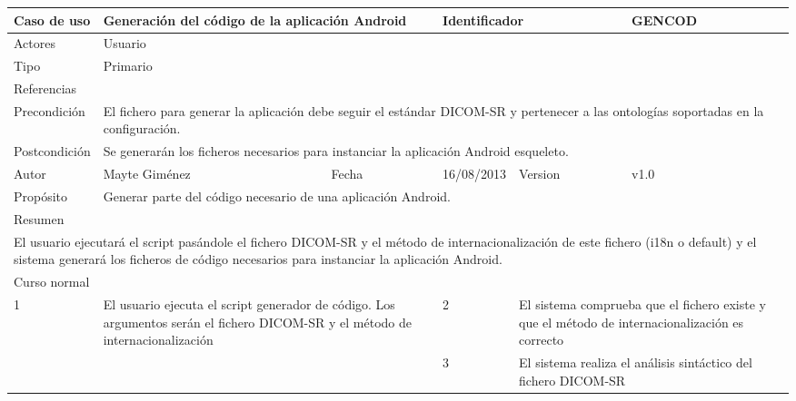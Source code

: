 \begin{center}
  \begin{longtable}{ |b{2.5cm}|b{4cm}|b{1cm}|b{2cm}|b{1.5cm}| b{2.5cm}| }
    \hline
    \cellcolor{RubineRed} {\color{White} Caso de uso} & \multicolumn{2}{|l|}{\parbox{4.5cm}{Generación del código de la aplicación Android}}  & \multicolumn{2}{|l|}{\color{RubineRed} Identificador}  &  GENCOD \\ 
    \hline \hline
    {\color{RubineRed} Actores } & \multicolumn{5}{|l|}{Usuario}  \\ 
    \hline
    {\color{RubineRed} Tipo } & \multicolumn{5}{|l|}{Primario}  \\ 
    \hline
    {\color{RubineRed} Referencias } & \multicolumn{5}{|l|}{}  \\ 
    \hline
    {\color{RubineRed} Precondición } & \multicolumn{5}{|l|}{\parbox{13cm}{El fichero para generar la aplicación debe seguir el estándar DICOM-SR y pertenecer a las ontologías soportadas en la configuración.} }  \\ 
    \hline
    {\color{RubineRed} Postcondición } & \multicolumn{5}{|l|}{\parbox{13cm}{Se generarán los ficheros necesarios para instanciar la aplicación Android esqueleto.}}  \\ 
    \hline
    {\color{RubineRed} Autor } &  Mayte Giménez & {\color{RubineRed} Fecha } & 16/08/2013 & {\color{RubineRed} Version } & v1.0 \\ 
    \hline
    {\color{RubineRed} Propósito } & \multicolumn{5}{|l|}{\parbox{13cm}{ Generar parte del código necesario de una aplicación Android.}}  \\ 
    \hline
    \multicolumn{6}{|l|}{{\color{RubineRed} Resumen }}  \\ 
    \hline
   	\multicolumn{6}{|l|}{\parbox{16cm}{El usuario ejecutará el script pasándole el fichero DICOM-SR y el método de internacionalización de este fichero (i18n o default) y el sistema generará los ficheros de código necesarios para instanciar la aplicación Android.}}  \\ 
    \hline
    \multicolumn{6}{|l|}{\parbox{8cm}{{\color{RubineRed} Curso normal }}}  \\ 
    \hline
   	1 & \multicolumn{2}{|l|}{\parbox{5cm}{ El usuario ejecuta el script generador de código. Los argumentos serán el fichero DICOM-SR y el método de internacionalización}} & 2 & \multicolumn{2}{|l|}{\parbox{5cm}{El sistema comprueba que el fichero existe y que el método de internacionalización es correcto}}\\
    \hline
     & \multicolumn{2}{|l|}{} & 3 &  \multicolumn{2}{|l|}{\parbox{5cm}{El sistema realiza el análisis sintáctico del fichero DICOM-SR}}\\

\end{longtable}
\end{center}
